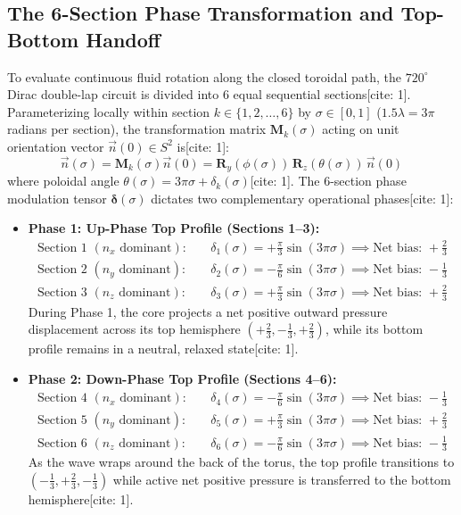 \documentclass[11pt,a4paper]{article}
\begin{document}
	\subsection{The 6-Section Phase Transformation and Top-Bottom Handoff}
	To evaluate continuous fluid rotation along the closed toroidal path, the $720^\circ$ Dirac double-lap circuit is divided into 6 equal sequential sections[cite: 1]. Parameterizing locally within section $k \in \{1, 2, \dots, 6\}$ by $\sigma \in [0,1]$ ($1.5\lambda = 3\pi$ radians per section), the transformation matrix $\mathbf{M}_k(\sigma)$ acting on unit orientation vector $\vec{n}(0) \in S^2$ is[cite: 1]:
	\begin{equation}
		\vec{n}(\sigma) = \mathbf{M}_k(\sigma) \vec{n}(0) = \mathbf{R}_y(\phi(\sigma)) \, \mathbf{R}_z(\theta(\sigma)) \, \vec{n}(0)
	\end{equation}
	where poloidal angle $\theta(\sigma) = 3\pi \sigma + \delta_k(\sigma)$[cite: 1]. The 6-section phase modulation tensor $\boldsymbol{\delta}(\sigma)$ dictates two complementary operational phases[cite: 1]:
	\begin{itemize}
		\item \textbf{Phase 1: Up-Phase Top Profile (Sections 1--3):}
		\begin{align}
			\text{Section 1 } (n_x \text{ dominant}): & \quad \delta_1(\sigma) = +\frac{\pi}{3} \sin(3\pi \sigma) \implies \text{Net bias: } +\frac{2}{3} \\
			\text{Section 2 } (n_y \text{ dominant}): & \quad \delta_2(\sigma) = -\frac{\pi}{6} \sin(3\pi \sigma) \implies \text{Net bias: } -\frac{1}{3} \\
			\text{Section 3 } (n_z \text{ dominant}): & \quad \delta_3(\sigma) = +\frac{\pi}{3} \sin(3\pi \sigma) \implies \text{Net bias: } +\frac{2}{3}
		\end{align}
		During Phase 1, the core projects a net positive outward pressure displacement across its top hemisphere $(+\frac{2}{3}, -\frac{1}{3}, +\frac{2}{3})$, while its bottom profile remains in a neutral, relaxed state[cite: 1].
		
		\item \textbf{Phase 2: Down-Phase Top Profile (Sections 4--6):}
		\begin{align}
			\text{Section 4 } (n_x \text{ dominant}): & \quad \delta_4(\sigma) = -\frac{\pi}{6} \sin(3\pi \sigma) \implies \text{Net bias: } -\frac{1}{3} \\
			\text{Section 5 } (n_y \text{ dominant}): & \quad \delta_5(\sigma) = +\frac{\pi}{3} \sin(3\pi \sigma) \implies \text{Net bias: } +\frac{2}{3} \\
			\text{Section 6 } (n_z \text{ dominant}): & \quad \delta_6(\sigma) = -\frac{\pi}{6} \sin(3\pi \sigma) \implies \text{Net bias: } -\frac{1}{3}
		\end{align}
		As the wave wraps around the back of the torus, the top profile transitions to $(-\frac{1}{3}, +\frac{2}{3}, -\frac{1}{3})$ while active net positive pressure is transferred to the bottom hemisphere[cite: 1].
	\end{itemize}
\end{document}
